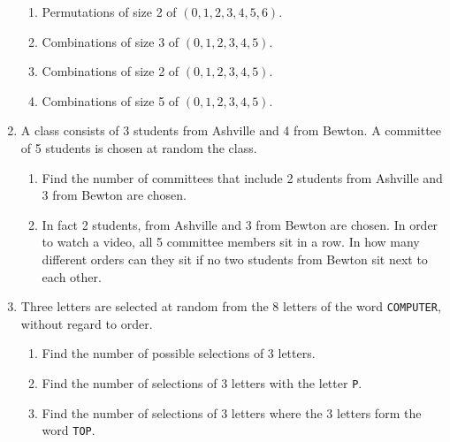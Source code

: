 \begin{enumerate}
\begin{enumerate}
\item 

Permutations of size 2 of \((0, 1, 2, 3, 4, 5, 6)\).

\item 

Combinations of size 3 of \((0, 1, 2, 3, 4, 5)\).

\item 

Combinations of size 2 of \((0, 1, 2, 3, 4, 5)\).

\item 

Combinations of size 5 of \((0, 1, 2, 3, 4, 5)\).

\end{enumerate}

\item 

A class consists of 3 students from Ashville and 4 from Bewton. A committee of 5 students is chosen at random the class.
\begin{enumerate}

\item 

Find the number of committees that include 2 students from Ashville and 3 from Bewton are chosen.

\item 

In fact 2 students, from Ashville and 3 from Bewton are chosen. In order to watch a video, all 5 committee members sit in a row. In how many different orders can they sit if no two students from Bewton sit next to each other.

\end{enumerate}

\item 

Three letters are selected at random from the 8 letters of the word \texttt{COMPUTER}, without regard to order.
\begin{enumerate}

\item 

Find the number of possible selections of 3 letters.

\item 

Find the number of selections of 3 letters with the letter \texttt{P}.

\item 

Find the number of selections of 3 letters where the 3 letters form the word \texttt{TOP}.

\end{enumerate}

\end{enumerate}

